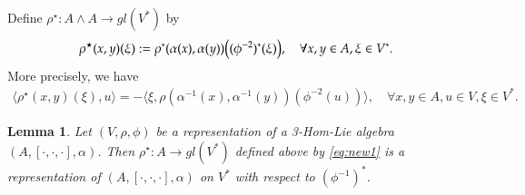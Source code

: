 \documentclass[a4paper,11pt]{article}
\def\a{\alpha}
\newtheorem{lem}[thm]{Lemma}
\theoremstyle{definition}
\begin{document}
Define $\rho^\star:A \wedge A \longrightarrow gl(V^*)$ by
\begin{equation}\label{eq:new1}
 \rho^\star(x,y)(\xi):=\rho^*(\a(x),\a(y))\big{(}(\phi^{-2})^*(\xi)\big{)},\quad\forall x,y\in A,\xi\in V^*.
\end{equation}
More precisely, we have
\begin{eqnarray}\label{eq:new1gen}
\langle\rho^\star(x,y)(\xi),u\rangle=-\langle\xi,\rho(\a^{-1}(x),\a^{-1}(y))(\phi^{-2}(u))\rangle,\quad\forall x,y\in A, u\in V, \xi \in V^*.
\end{eqnarray}
\begin{lem}\label{lem:dualrep}
 Let $(V,\rho,\phi )$ be a representation of a 3-Hom-Lie algebra $(A,[\cdot,\cdot,\cdot],\a)$. Then $\rho^\star:A \longrightarrow gl(V^*)$ defined above by \eqref{eq:new1} is a representation of $(A,[\cdot,\cdot,\cdot],\a)$ on $V^*$ with respect to $(\phi^{-1})^*$.
\end{lem}
\end{document}
